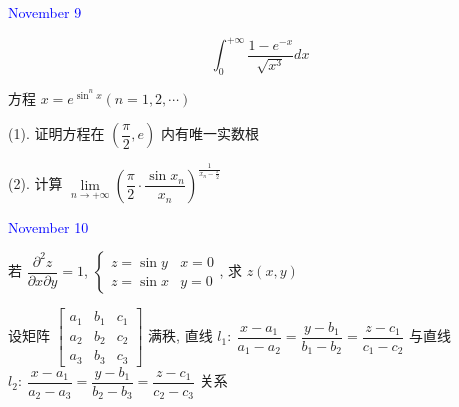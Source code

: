 \begin{solution}
	
\end{solution}


\textcolor{blue}{November 9}

\begin{example}[][Exam: 37.2.3]
	$$\int_{0}^{+\infty}\dfrac{1-e^{-x}}{\sqrt{x^3}}dx$$
\end{example}

\begin{solution}
	
\end{solution}

\begin{example}[][Exam: 37.2.4]
	方程 $\displaystyle{x=e^{\sin^{n}x}(n=1,2,\cdots)}$

(1). 证明方程在 $(\dfrac{\pi}{2},e)$ 内有唯一实数根

(2). 计算 $\displaystyle{\lim\limits_{n\to +\infty}\left(\dfrac{\pi}{2}\cdot \dfrac{\sin x_{n}}{x_{n}} \right)^{\frac{1}{x_{n}-\frac{\pi}{2}}}}$
\end{example}
\begin{solution}
	
\end{solution}


\textcolor{blue}{November 10}

\begin{example}[][Exam: 37.2.5]
	若 $\dfrac{\partial^2 z}{\partial x\partial y}=1$, 
$\begin{cases}
	z = \sin y & x=0 \\
	z = \sin x & y=0
\end{cases}$, 求 $z(x,y)$
\end{example}

\begin{solution}
	
\end{solution}

\begin{example}[][Exam: 37.2.6]
	设矩阵 $\begin{bmatrix}
	a_{1} & b_{1} & c_{1} \\
	a_{2} & b_{2} & c_{2} \\
	a_{3} & b_{3} & c_{3}
	\end{bmatrix}$ 满秩, 直线
 $l_{1}:\ \dfrac{x-a_{1}}{a_{1}-a_{2}}=\dfrac{y-b_{1}}{b_{1}-b_{2}}=\dfrac{z-c_{1}}{c_{1}-c_{2}}$
 与直线 $l_{2}:\ \dfrac{x-a_{1}}{a_{2}-a_{3}}=\dfrac{y-b_{1}}{b_{2}-b_{3}}=\dfrac{z-c_{1}}{c_{2}-c_{3}}$ 关系
\end{example}

